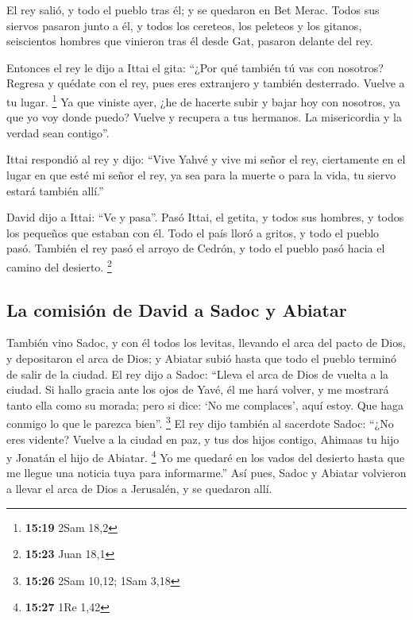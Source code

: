  El rey salió, y todo el pueblo tras él; y se quedaron en
Bet Merac.  Todos sus siervos pasaron junto a él, y todos
los cereteos, los peleteos y los gitanos, seiscientos hombres que
vinieron tras él desde Gat, pasaron delante del rey.

 Entonces el rey le dijo a Ittai el gita: ``¿Por qué
también tú vas con nosotros? Regresa y quédate con el rey, pues eres
extranjero y también desterrado. Vuelve a tu lugar. \footnote{\textbf{15:19}
  2Sam 18,2}  Ya que viniste ayer, ¿he de hacerte subir y
bajar hoy con nosotros, ya que yo voy donde puedo? Vuelve y recupera a
tus hermanos. La misericordia y la verdad sean contigo''.

 Ittai respondió al rey y dijo: ``Vive Yahvé y vive mi
señor el rey, ciertamente en el lugar en que esté mi señor el rey, ya
sea para la muerte o para la vida, tu siervo estará también allí.''

 David dijo a Ittai: ``Ve y pasa''. Pasó Ittai, el
getita, y todos sus hombres, y todos los pequeños que estaban con él.
 Todo el país lloró a gritos, y todo el pueblo pasó.
También el rey pasó el arroyo de Cedrón, y todo el pueblo pasó hacia el
camino del desierto. \footnote{\textbf{15:23} Juan 18,1}

\hypertarget{la-comisiuxf3n-de-david-a-sadoc-y-abiatar}{%
\subsection{La comisión de David a Sadoc y
Abiatar}\label{la-comisiuxf3n-de-david-a-sadoc-y-abiatar}}

 También vino Sadoc, y con él todos los levitas, llevando
el arca del pacto de Dios, y depositaron el arca de Dios; y Abiatar
subió hasta que todo el pueblo terminó de salir de la ciudad.
 El rey dijo a Sadoc: ``Lleva el arca de Dios de vuelta a
la ciudad. Si hallo gracia ante los ojos de Yavé, él me hará volver, y
me mostrará tanto ella como su morada;  pero si dice: `No
me complaces', aquí estoy. Que haga conmigo lo que le parezca bien''.
\footnote{\textbf{15:26} 2Sam 10,12; 1Sam 3,18}  El rey
dijo también al sacerdote Sadoc: ``¿No eres vidente? Vuelve a la ciudad
en paz, y tus dos hijos contigo, Ahimaas tu hijo y Jonatán el hijo de
Abiatar. \footnote{\textbf{15:27} 1Re 1,42}  Yo me
quedaré en los vados del desierto hasta que me llegue una noticia tuya
para informarme.''  Así pues, Sadoc y Abiatar volvieron a
llevar el arca de Dios a Jerusalén, y se quedaron allí.

